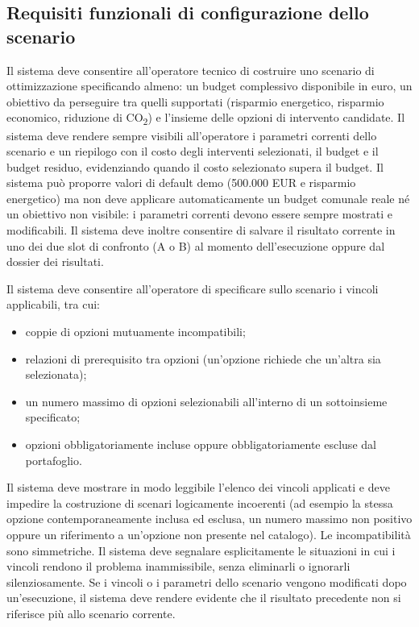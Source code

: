 \subsection{Requisiti funzionali di configurazione dello scenario}

 \label{rf:config_scenario}
Il sistema deve consentire all'operatore tecnico di costruire uno scenario di ottimizzazione specificando almeno: un budget complessivo disponibile in euro, un obiettivo da perseguire tra quelli supportati (risparmio energetico, risparmio economico, riduzione di CO\textsubscript{2}) e l'insieme delle opzioni di intervento candidate. Il sistema deve rendere sempre visibili all'operatore i parametri correnti dello scenario e un riepilogo con il costo degli interventi selezionati, il budget e il budget residuo, evidenziando quando il costo selezionato supera il budget. Il sistema può proporre valori di default demo (500.000 EUR e risparmio energetico) ma non deve applicare automaticamente un budget comunale reale né un obiettivo non visibile: i parametri correnti devono essere sempre mostrati e modificabili. Il sistema deve inoltre consentire di salvare il risultato corrente in uno dei due slot di confronto (A o B) al momento dell'esecuzione oppure dal dossier dei risultati.

 \label{rf:vincoli_scenario}
Il sistema deve consentire all'operatore di specificare sullo scenario i vincoli applicabili, tra cui:
\begin{itemize}[leftmargin=1.4em, itemsep=0.15em]
    \item coppie di opzioni mutuamente incompatibili;
    \item relazioni di prerequisito tra opzioni (un'opzione richiede che un'altra sia selezionata);
    \item un numero massimo di opzioni selezionabili all'interno di un sottoinsieme specificato;
    \item opzioni obbligatoriamente incluse oppure obbligatoriamente escluse dal portafoglio.
\end{itemize}
Il sistema deve mostrare in modo leggibile l'elenco dei vincoli applicati e deve impedire la costruzione di scenari logicamente incoerenti (ad esempio la stessa opzione contemporaneamente inclusa ed esclusa, un numero massimo non positivo oppure un riferimento a un'opzione non presente nel catalogo). Le incompatibilità sono simmetriche. Il sistema deve segnalare esplicitamente le situazioni in cui i vincoli rendono il problema inammissibile, senza eliminarli o ignorarli silenziosamente. Se i vincoli o i parametri dello scenario vengono modificati dopo un'esecuzione, il sistema deve rendere evidente che il risultato precedente non si riferisce più allo scenario corrente.

